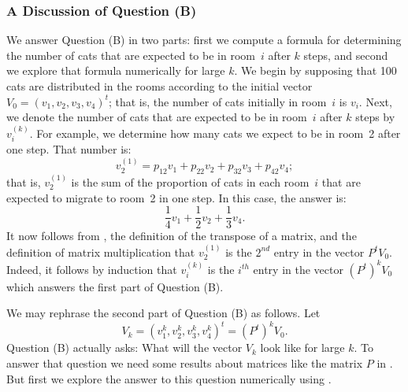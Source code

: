 \subsubsection*{A Discussion of Question (B)}

We answer Question (B) in two parts: first we compute a formula for
determining the number of cats that are expected to be in room~$i$ after $k$
steps, and second we explore that formula numerically for large $k$.  We
begin by supposing that 100 cats are distributed in the rooms according to
the initial vector $V_0=(v_1,v_2,v_3,v_4)^t$; that is, the number of cats
initially in room~$i$ is $v_i$.  Next, we denote the number of cats that are
expected to be in room~$i$ after $k$ steps by $v_i^{(k)}$.  For example, we
determine how many cats we expect to be in room~2 after one step.  That
number is:
\begin{equation} \label{E:probt2}
v_2^{(1)}=p_{12}v_1 + p_{22}v_2 + p_{32}v_3 + p_{42}v_4;
\end{equation}
that is, $v_2^{(1)}$ is the sum of the proportion of cats in each room~$i$
that are expected to migrate to room~2 in one step.  In this case, the answer
is:
\[
\frac{1}{4}v_1 + \frac{1}{2}v_2 + \frac{1}{3}v_4.
\]
It now follows from , the definition of the transpose of a
matrix, and the definition of matrix multiplication that $v_2^{(1)}$ is
the $2^{nd}$ entry in the vector $P^tV_0$.  Indeed, it follows by induction
that $v_i^{(k)}$ is the $i^{th}$ entry in the vector $(P^t)^kV_0$ which
answers the first part of Question (B).

We may rephrase the second part of Question (B) as follows.  Let
\[
V_k = (v_1^{k},v_2^{k},v_3^{k},v_4^{k})^t = (P^t)^kV_0.
\]
Question (B) actually asks: What will the vector $V_k$ look like for
large $k$.  To answer that question we need some results about matrices
like the matrix $P$ in .  But first we explore the answer to
this question numerically using \Matlabp.

